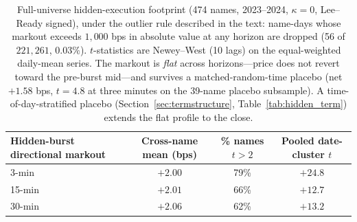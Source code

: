 \documentclass[11pt]{article}
\begin{document}
\begin{table}[htbp]
\centering
\begin{tabular}{lccc}
\toprule
\textbf{Hidden-burst directional markout} & \textbf{Cross-name mean (bps)} & \textbf{\% names $t>2$} & \textbf{Pooled date-cluster $t$} \\
\midrule
3-min  & $+2.00$ & 79\% & $+24.8$ \\
15-min & $+2.01$ & 66\% & $+12.7$ \\
30-min & $+2.06$ & 62\% & $+13.2$ \\
\bottomrule
\end{tabular}
\caption{Full-universe hidden-execution footprint (474 names, 2023--2024, $\kappa=0$, Lee--Ready signed), under the outlier rule described in the text: name-days whose markout exceeds $1{,}000$ bps in absolute value at any horizon are dropped (56 of $221{,}261$, $0.03\%$). $t$-statistics are Newey--West (10 lags) on the equal-weighted daily-mean series. The markout is \emph{flat} across horizons---price does not revert toward the pre-burst mid---and survives a matched-random-time placebo (net $+1.58$ bps, $t=4.8$ at three minutes on the 39-name placebo subsample). A time-of-day-stratified placebo (Section~\ref{sec:termstructure}, Table~\ref{tab:hidden_term}) extends the flat profile to the close.}
\label{tab:hidden_xsec}
\end{table}
\end{document}
